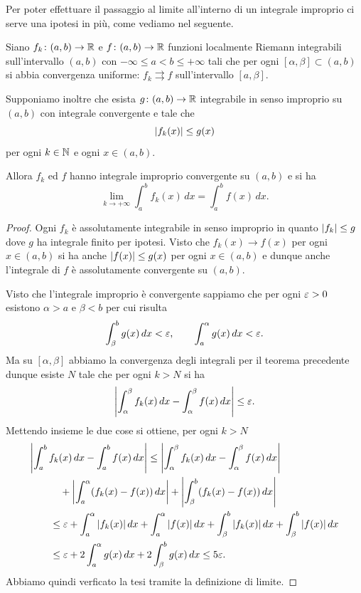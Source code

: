 Per poter effettuare il passaggio al limite all'interno di un integrale 
improprio ci serve una ipotesi in più, come vediamo nel seguente.

\begin{theorem}%
  \label{th:convergenza_dominata_uniforme}%
%
  Siano $f_k\colon (a,b) \to {\mathbb R}$ e $f\colon (a,b)\to {\mathbb R}$ funzioni 
  localmente Riemann integrabili
  sull'intervallo $(a,b)$ con $-\infty \le a < b \le +\infty$
  tali che per ogni $[\alpha,\beta]\subset (a,b)$ 
  si abbia convergenza uniforme: $f_k\rightrightarrows f$ 
  sull'intervallo $[a,\beta]$.
  
  Supponiamo inoltre che esista $g\colon (a,b)\to {\mathbb R}$
  integrabile in senso improprio su $(a,b)$ con integrale convergente e tale
  che
  \[
  {\left|f_k(x)\right|}\le g(x)
  \]
  per ogni $k\in {\mathbb N}$ e ogni $x\in (a,b)$.
    
  Allora $f_k$ ed $f$ hanno integrale improprio convergente su $(a,b)$ e si ha
  \[
    \lim_{k\to+\infty} \int_a^b f_k(x)\, dx = \int_a^b f(x)\, dx.
  \]
\end{theorem}
%
\begin{proof}
  Ogni $f_k$ è assolutamente integrabile in senso improprio in quanto
  ${\left|f_k\right|}\le g$ dove $g$ ha integrale finito per ipotesi.
  Visto che $f_k(x)\to f(x)$ per ogni  $x\in (a,b)$
  si ha anche ${\left|f(x)\right|}\le g(x)$ per ogni $x\in (a,b)$ 
  e dunque anche l'integrale di $f$ è assolutamente convergente su $(a,b)$.
  
  Visto che l'integrale improprio è convergente sappiamo che 
  per ogni $\varepsilon>0$ esistono $\alpha>a$ e $\beta<b$ per cui risulta
  \[
    \int_\beta^b g(x)\, dx < \varepsilon, \qquad 
    \int_a^\alpha g(x)\, dx < \varepsilon.
  \]
  Ma su $[\alpha ,\beta]$ abbiamo la convergenza degli integrali per il teorema precedente
  dunque esiste $N$ tale che per ogni $k > N$ si ha 
  \[
   {\left|\int_\alpha^\beta f_k(x)\, dx - \int_\alpha^\beta f(x)\, dx\right|} \le \varepsilon. 
  \]
  Mettendo insieme le due cose si ottiene,
  per ogni $k>N$
  \begin{align*}
    \MoveEqLeft{\abs{\int_a^b f_k(x)\, dx - \int_a^b f(x)\, dx}} \le \abs{\int_\alpha^\beta f_k(x)\, dx - \int_\alpha^\beta f(x)\, dx} \\
    & \quad + \abs{\int_a^\alpha (f_k(x) - f(x))\, dx }
      + \abs{\int_\beta^b (f_k(x) - f(x))\, dx } \\
    &\le \eps 
    + \int_a^\alpha \abs{f_k(x)}\, dx + \int_a^\alpha\abs{f(x)}\, dx
    + \int_\beta^b \abs{f_k(x)}\, dx + \int_\beta^b\abs{f(x)}\, dx\\
    &\le \eps 
    + 2 \int_a^\alpha g(x)\,dx
    + 2 \int_\beta^b g(x)\,dx 
    \le 5 \eps.
  \end{align*}
  Abbiamo quindi verficato la tesi tramite la definizione di limite.
\end{proof}

